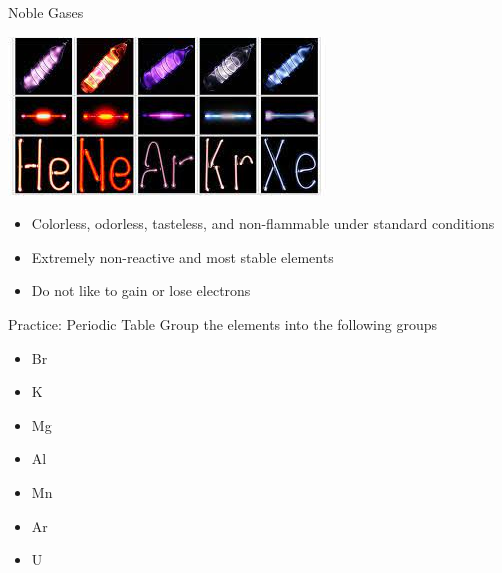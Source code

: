 \documentclass[11pt]{beamer}
\begin{document}
\begin{frame}{Noble Gases}
  \begin{center}
    \includegraphics[scale=0.7]{neon_lights}
  \end{center}
  
  \begin{itemize}
  \item Colorless, odorless, tasteless, and non-flammable
    under standard conditions
  \item Extremely non-reactive and most stable elements
  \item Do not like to gain or lose electrons
  \end{itemize}
\end{frame}

\begin{frame}{Practice: Periodic Table}
  Group the elements into the following groups
  \begin{itemize}
  \item Br
  \item K
  \item Mg
  \item Al
  \item Mn
  \item Ar
  \item U
  \end{itemize}
\end{frame}
\end{document}
